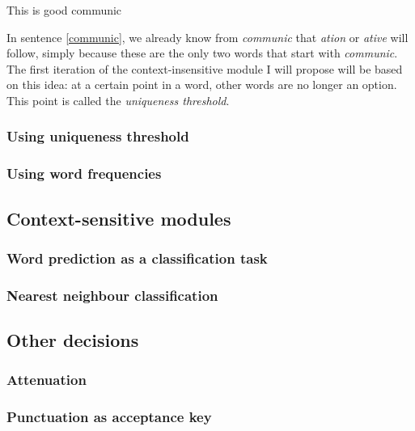 \documentclass[12pt]{article}
\begin{document}
\begin{examples}
\item This is good communic \label{communic}
\end{examples}

In sentence \ref{communic}, we already know from \emph{communic} that \emph{ation} or \emph{ative} will follow, simply because these are the only two words that start with \emph{communic}. The first iteration of the context-insensitive module I will propose will be based on this idea: at a certain point in a word, other words are no longer an option. This point is called the \emph{uniqueness threshold}.

\subsubsection{Using uniqueness threshold}

\subsubsection{Using word frequencies}

\subsection{Context-sensitive modules} \label{cs}

\subsubsection{Word prediction as a classification task}

\subsubsection{Nearest neighbour classification}

\subsection{Other decisions}

\subsubsection{Attenuation}

\subsubsection{Punctuation as acceptance key}
\end{document}
